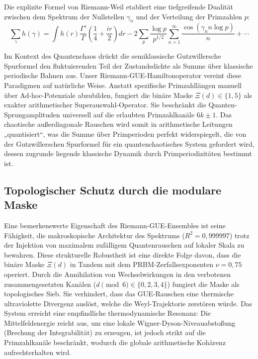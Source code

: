 \documentclass[aps,prl,preprint,superscriptaddress,floatfix]{revtex4-2}
\begin{document}
Die explizite Formel von Riemann-Weil etabliert eine tiefgreifende Dualität zwischen dem Spektrum der Nullstellen $\gamma_n$ und der Verteilung der Primzahlen $p$:
\begin{equation}
\sum_{\gamma} h(\gamma) = \int h(r) \frac{\Gamma'}{\Gamma}\left(\frac14 + \frac{ir}{2}\right) dr - 2\sum_{p} \frac{\log p}{p^{1/2}} \sum_{n=1}^\infty \frac{\cos(\gamma_n n\log p)}{n} + \cdots
\end{equation}

Im Kontext des Quantenchaos drückt die semiklassische Gutzwillersche Spurformel den fluktuierenden Teil der Zustandsdichte als Summe über klassische periodische Bahnen aus. Unser Riemann-GUE-Hamiltonoperator vereint diese Paradigmen auf natürliche Weise. Anstatt spezifische Primzahllängen manuell über Ad-hoc-Potenziale abzubilden, fungiert die binäre Maske $\Xi(d) \in \{1,5\}$ als exakter arithmetischer Superauswahl-Operator. Sie beschränkt die Quanten-Sprungamplituden universell auf die erlaubten Primzahlkanäle $6k\pm1$. Das chaotische außerdiagonale Rauschen wird somit in arithmetische Leitungen „quantisiert“, was die Summe über Primperioden perfekt widerspiegelt, die von der Gutzwillerschen Spurformel für ein quantenchaotisches System gefordert wird, dessen zugrunde liegende klassische Dynamik durch Primperiodizitäten bestimmt ist.

\subsection{Topologischer Schutz durch die modulare Maske}

Eine bemerkenswerte Eigenschaft des Riemann-GUE-Ensembles ist seine Fähigkeit, die makroskopische Architektur des Spektrums ($R^2 = 0,999997$) trotz der Injektion von maximalem zufälligem Quantenrauschen auf lokaler Skala zu bewahren. Diese strukturelle Robustheit ist eine direkte Folge davon, dass die binäre Maske $\Xi(d)$ in Tandem mit dem PRBM-Zerfallsexponenten $\nu = 0,75$ operiert. Durch die Annihilation von Wechselwirkungen in den verbotenen zusammengesetzten Kanälen ($d \pmod 6 \in \{0, 2, 3, 4\}$) fungiert die Maske als topologisches Sieb. Sie verhindert, dass das GUE-Rauschen eine thermische ultraviolette Divergenz auslöst, welche die Weyl-Trajektorie zerstören würde. Das System erreicht eine empfindliche thermodynamische Resonanz: Die Mittelfeldenergie reicht aus, um eine lokale Wigner-Dyson-Niveauabstoßung (Brechung der Integrabilität) zu erzeugen, ist jedoch strikt auf die Primzahlkanäle beschränkt, wodurch die globale arithmetische Kohärenz aufrechterhalten wird.
\end{document}
